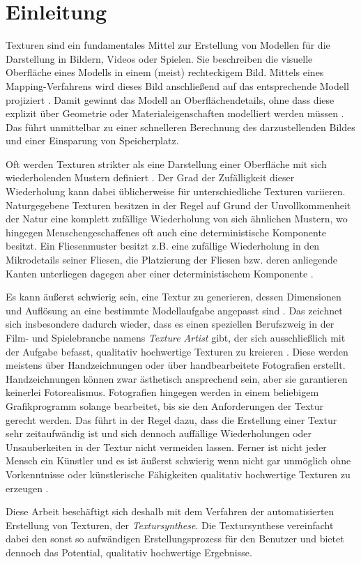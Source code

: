 \section{Einleitung}

Texturen sind ein fundamentales Mittel zur Erstellung von Modellen für die Darstellung in Bildern, Videos oder Spielen.
Sie beschreiben die visuelle Oberfläche eines Modells in einem (meist) rechteckigem Bild.
Mittels eines Mapping-Verfahrens wird dieses Bild anschließend auf das entsprechende Modell projiziert \cite{SelfTuning}.
Damit gewinnt das Modell an Oberflächendetails, ohne dass diese explizit über Geometrie oder Materialeigenschaften modelliert werden müssen \cite{StateOfTheArt}.
Das führt unmittelbar zu einer schnelleren Berechnung des darzustellenden Bildes und einer Einsparung von Speicherplatz.

Oft werden Texturen strikter als eine Darstellung einer Oberfläche mit sich wiederholenden Mustern definiert \cite{StateOfTheArt}.
Der Grad der Zufälligkeit dieser Wiederholung kann dabei üblicherweise für unterschiedliche Texturen variieren.
Naturgegebene Texturen besitzen in der Regel auf Grund der Unvollkommenheit der Natur eine komplett zufällige Wiederholung von sich ähnlichen Mustern, wo hingegen Menschengeschaffenes oft auch eine deterministische Komponente besitzt.
Ein Fliesenmuster besitzt z.B. eine zufällige Wiederholung in den Mikrodetails seiner Fliesen, die Platzierung der Fliesen bzw. deren anliegende Kanten unterliegen dagegen aber einer deterministischem Komponente \cite{StateOfTheArt}.

Es kann äußerst schwierig sein, eine Textur zu generieren, dessen Dimensionen und Auflösung an eine bestimmte Modellaufgabe angepasst sind \cite{SelfTuning}.
Das zeichnet sich insbesondere dadurch wieder, dass es einen speziellen Berufszweig in der Film- und Spielebranche namens \emph{Texture Artist} gibt, der sich ausschließlich mit der Aufgabe befasst, qualitativ hochwertige Texturen zu kreieren \cite{StateOfTheArt}.
Diese werden meistens über Handzeichnungen oder über handbearbeitete Fotografien erstellt.
Handzeichnungen können zwar ästhetisch ansprechend sein, aber sie garantieren keinerlei Fotorealismus.
Fotografien hingegen werden in einem beliebigem Grafikprogramm solange bearbeitet, bis sie den Anforderungen der Textur gerecht werden.
Das führt in der Regel dazu, dass die Erstellung einer Textur sehr zeitaufwändig ist und sich dennoch auffällige Wiederholungen oder Unsauberkeiten in der Textur nicht vermeiden lassen.
Ferner ist nicht jeder Mensch ein Künstler und es ist äußerst schwierig wenn nicht gar unmöglich ohne Vorkenntnisse oder künstlerische Fähigkeiten qualitativ hochwertige Texturen zu erzeugen \cite{StateOfTheArt}.

Diese Arbeit beschäftigt sich deshalb mit dem Verfahren der automatisierten Erstellung von Texturen, der \emph{Textursynthese}.
Die Textursynthese vereinfacht dabei den sonst so aufwändigen Erstellungsprozess für den Benutzer und bietet dennoch das Potential, qualitativ hochwertige Ergebnisse.